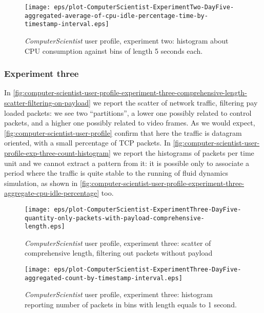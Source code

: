 \documentclass[10pt,a4paper]{article}
\begin{document}
    \begin{figure}
      \centering
      \texttt{[image: eps/plot-ComputerScientist-ExperimentTwo-DayFive-aggregated-average-of-cpu-idle-percentage-time-by-timestamp-interval.eps]}
      \caption{\emph{ComputerScientist} user profile, experiment two:
        histogram about CPU consumption against bins of length 5
        seconds each.}
      \label{fig:computer-scientist-user-profile-experiment-two-aggregate-cpu-idle-percentage}
    \end{figure}

    \subsubsection*{Experiment three}

    In
    \autoref{fig:computer-scientist-user-profile-experiment-three-comprehensive-length-scatter-filtering-on-payload}
    we report the scatter of network traffic, filtering pay loaded
    packets: we see two ``partitions'', a lower one possibly related
    to control packets, and a higher one possibly related to video
    frames. As we would expect,
    \autoref{fig:computer-scientist-user-profile} confirm that here
    the traffic is datagram oriented, with a small percentage of TCP
    packets. In
    \autoref{fig:computer-scientist-user-profile-exp-three-count-histogram}
    we report the histograms of packets per time unit and we cannot
    extract a pattern from it: it is possible only to associate a
    period where the traffic is quite stable to the running of fluid
    dynamics simulation, as shown in
    \autoref{fig:computer-scientist-user-profile-experiment-three-aggregate-cpu-idle-percentage}
    too.

    \begin{figure}
      \centering
      \texttt{[image: eps/plot-ComputerScientist-ExperimentThree-DayFive-quantity-only-packets-with-payload-comprehensive-length.eps]}
      \caption{\emph{ComputerScientist} user profile, experiment
        three: scatter of comprehensive length, filtering out packets
        without payload}
      \label{fig:computer-scientist-user-profile-experiment-three-comprehensive-length-scatter-filtering-on-payload}
    \end{figure}

    \begin{figure}
      \centering
      \texttt{[image: eps/plot-ComputerScientist-ExperimentThree-DayFive-aggregated-count-by-timestamp-interval.eps]}
      \caption{\emph{ComputerScientist} user profile, experiment three: histogram
        reporting number of packets in bins with length equals to 1
        second.}
      \label{fig:computer-scientist-user-profile-exp-three-count-histogram}
    \end{figure}
\end{document}
